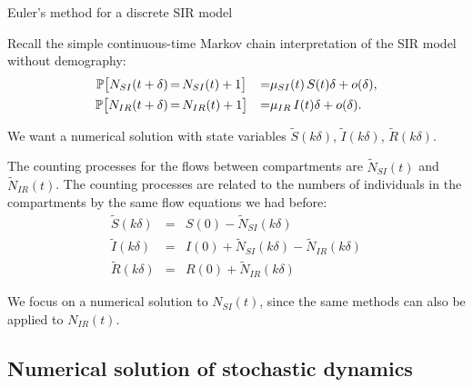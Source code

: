 \begin{frame}[allowframebreaks=0.8]{Euler's method for a discrete SIR model}
  \bi
\item Recall the simple continuous-time Markov chain interpretation of the SIR model without demography:
  \begin{equation*}
    \begin{aligned}
      \mathbb{P}\big[N_{SI}(t+\delta)&{ \, = \, } N_{SI}(t)+1\big] &=& \mu_{SI}(t) \, S(t) \delta + o(\delta),
      \\
      \mathbb{P}\big[N_{IR}(t+\delta)&{ \, = \, } N_{IR}(t)+1\big] &=& \mu_{IR} \, I(t) \delta + o(\delta).
    \end{aligned}
  \end{equation*}
\item We want a numerical solution with state variables $\tilde S(k\delta)$, $\tilde I(k\delta)$, $\tilde R(k\delta)$. 
\item The counting processes for the flows between compartments are $\tilde N_{SI}(t)$ and $\tilde N_{IR}(t)$. The counting processes are related to the numbers of individuals in the compartments by the same flow equations we had before:
  $$\begin{array}{lcl} 
  \tilde S(k\delta)&=& S(0) - \tilde N_{SI}(k\delta)
  \\
  \tilde I(k\delta)&=& I(0) + \tilde N_{SI}(k\delta) - \tilde N_{IR}(k\delta)
  \\
  \tilde R(k\delta) &=& R(0) + \tilde N_{IR}(k\delta)
\end{array}$$
\item We focus on a numerical solution to $N_{SI}(t)$, since the same methods can also be applied to $N_{IR}(t)$.
  \ei
\end{frame}

\subsection{Numerical solution of stochastic dynamics}

